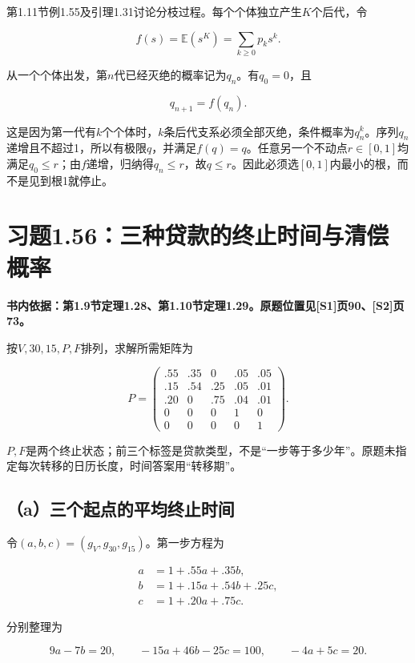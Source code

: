 \documentclass[
  11pt,a4paper,UTF8,fontset=fandol]{ctexart}
\begin{document}
第1.11节例1.55及引理1.31讨论分枝过程。每个个体独立产生\(K\)个后代，令

\[
f(s)=\mathbb E(s^K)=\sum_{k\ge0}p_ks^k.
\]

从一个个体出发，第\(n\)代已经灭绝的概率记为\(q_n\)。有\(q_0=0\)，且

\[
q_{n+1}=f(q_n).
\]

这是因为第一代有\(k\)个个体时，\(k\)条后代支系必须全部灭绝，条件概率为\(q_n^k\)。序列\(q_n\)递增且不超过1，所以有极限\(q\)，并满足\(f(q)=q\)。任意另一个不动点\(r\in[0,1]\)均满足\(q_0\le r\)；由\(f\)递增，归纳得\(q_n\le r\)，故\(q\le r\)。因此必须选\([0,1]\)内最小的根，而不是见到根1就停止。

\section{习题1.56：三种贷款的终止时间与清偿概率}\label{ux4e60ux98981.56ux4e09ux79cdux8d37ux6b3eux7684ux7ec8ux6b62ux65f6ux95f4ux4e0eux6e05ux507fux6982ux7387}

\textbf{书内依据：第1.9节定理1.28、第1.10节定理1.29。原题位置见{[}S1{]}页90、{[}S2{]}页73。}

按\(V,30,15,P,F\)排列，求解所需矩阵为

\[
P=\begin{pmatrix}
.55&.35&0&.05&.05\\
.15&.54&.25&.05&.01\\
.20&0&.75&.04&.01\\
0&0&0&1&0\\
0&0&0&0&1
\end{pmatrix}.
\]

\(P,F\)是两个终止状态；前三个标签是贷款类型，不是``一步等于多少年''。原题未指定每次转移的日历长度，时间答案用``转移期''。

\subsection{（a）三个起点的平均终止时间}\label{aux4e09ux4e2aux8d77ux70b9ux7684ux5e73ux5747ux7ec8ux6b62ux65f6ux95f4}

令\((a,b,c)=(g_V,g_{30},g_{15})\)。第一步方程为

\[
\begin{aligned}
a&=1+.55a+.35b,\\
b&=1+.15a+.54b+.25c,\\
c&=1+.20a+.75c.
\end{aligned}
\]

分别整理为

\[
9a-7b=20,\qquad -15a+46b-25c=100,\qquad -4a+5c=20.
\]
\end{document}
